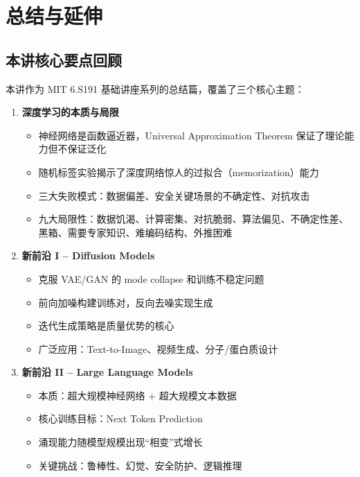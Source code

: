\section{总结与延伸}

\subsection{本讲核心要点回顾}

本讲作为 MIT 6.S191 基础讲座系列的总结篇，覆盖了三个核心主题：

\begin{enumerate}
    \item \textbf{深度学习的本质与局限}
    \begin{itemize}
        \item 神经网络是函数逼近器，Universal Approximation Theorem 保证了理论能力但不保证泛化
        \item 随机标签实验揭示了深度网络惊人的过拟合（memorization）能力
        \item 三大失败模式：数据偏差、安全关键场景的不确定性、对抗攻击
        \item 九大局限性：数据饥渴、计算密集、对抗脆弱、算法偏见、不确定性差、黑箱、需要专家知识、难编码结构、外推困难
    \end{itemize}

    \item \textbf{新前沿 I -- Diffusion Models}
    \begin{itemize}
        \item 克服 VAE/GAN 的 mode collapse 和训练不稳定问题
        \item 前向加噪构建训练对，反向去噪实现生成
        \item 迭代生成策略是质量优势的核心
        \item 广泛应用：Text-to-Image、视频生成、分子/蛋白质设计
    \end{itemize}

    \item \textbf{新前沿 II -- Large Language Models}
    \begin{itemize}
        \item 本质：超大规模神经网络 + 超大规模文本数据
        \item 核心训练目标：Next Token Prediction
        \item 涌现能力随模型规模出现``相变''式增长
        \item 关键挑战：鲁棒性、幻觉、安全防护、逻辑推理
    \end{itemize}
\end{enumerate}

